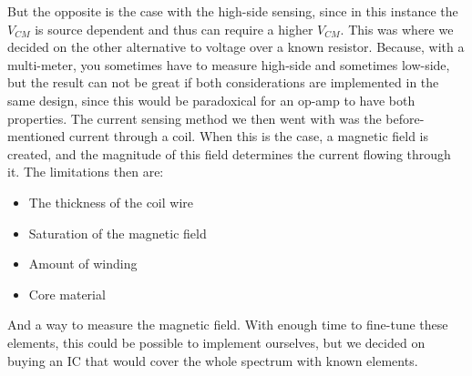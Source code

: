 But the opposite is the case with the high-side sensing, since in this instance the $V_{CM}$ is source dependent and thus can require a higher $V_{CM}$. This was where we decided on the other alternative to voltage over a known resistor. Because, with a multi-meter, you sometimes have to measure high-side and sometimes low-side, but the result can not be great if both considerations are implemented in the same design, since this would be paradoxical for an op-amp to have both properties.
\newpage
The current sensing method we then went with was the before-mentioned current through a coil. When this is the case, a magnetic field is created, and the magnitude of this field determines the current flowing through it. The limitations then are:
\begin{itemize}
    \item The thickness of the coil wire
    \item Saturation of the magnetic field
    \item Amount of winding
    \item Core material
\end{itemize}
And a way to measure the magnetic field.
With enough time to fine-tune these elements, this could be possible to implement ourselves, but we decided on buying an IC that would cover the whole spectrum with known elements.


